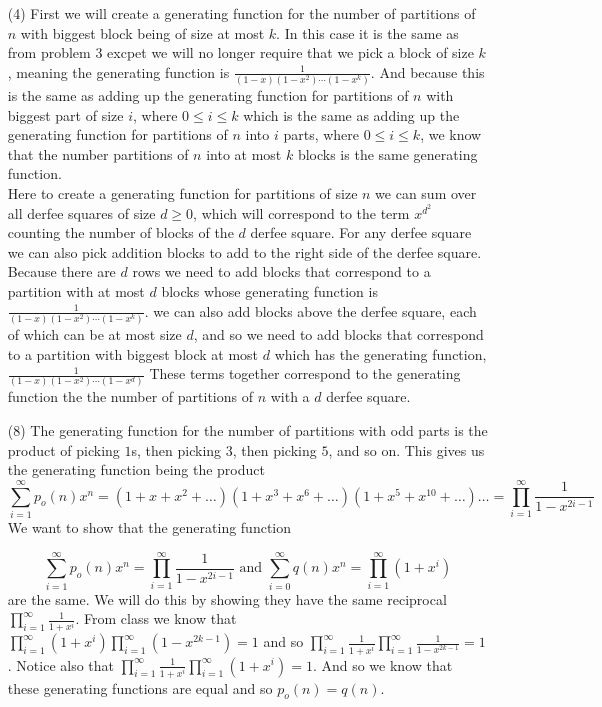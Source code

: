 \documentclass[12pt]{amsart}
\theoremstyle{definition}
\begin{document}
\begin{itemize}
\item[(4)] %
First we will create a generating function for the number of partitions of $n$ with biggest block being of size at most $k$. In this case it is the same as from problem $3$ excpet we will no longer require that we pick a block of size $k$, meaning the generating function is $\frac{1}{(1-x)(1-x^2)\cdots (1-x^k)}$. And because this is the same as adding up the generating function for partitions of $n$ with biggest part of size $i$, where $0\leq i\leq k$ which is the same as adding up the generating function for partitions of $n$ into $i$ parts, where $0\leq i\leq k$, we know that the number partitions of $n$ into at most $k$ blocks is the same generating function.\\

Here to create a generating function for partitions of size $n$ we can sum over all derfee squares of size $d\geq 0$, which will correspond to the term $x^{d^2}$ counting the number of blocks of the $d$ derfee square. For any derfee square we can also pick addition blocks to add to the right side of the derfee square. Because there are $d$ rows we need to add blocks that correspond to a partition with at most $d$ blocks whose generating function is $\frac{1}{(1-x)(1-x^2)\cdots (1-x^k)}$. we can also add blocks above the derfee square, each of which can be at most size $d$, and so we need to add blocks that correspond to a partition with biggest block at most $d$ which has the generating function, $\frac{1}{(1-x)(1-x^2)\cdots (1-x^d)}$ These terms together correspond to the generating function the the number of partitions of $n$ with a $d$ derfee square.\\

\item[(8)] %
The generating function for the number of partitions with odd parts is the product of picking $1$s, then picking $3$, then picking $5$, and so on. This gives us the generating function being the product $$\sum_{i=1}^{\infty} p_o(n)x^n= (1+x+x^2+\dots)(1+x^3+x^6+\dots)(1+x^5+x^{10}+\dots)\dots=\prod_{i=1}^\infty \frac{1}{1-x^{2i-1}}$$
We want to show that the generating function 

$${\sum_{i=1}^{\infty} p_o(n)x^n=\prod_{i=1}^\infty \frac{1}{1-x^{2i-1}}}\text{ and }{\sum_{i=0}^\infty q(n)x^n=\prod_{i=1}^{\infty}(1+x^i)}$$
are the same. We will do this by showing they have the same reciprocal $\prod_{i=1}^{\infty}\frac{1}{1+x^i}$. From class we know that $\prod_{i=1}^{\infty}(1+x^i)\prod_{i=1}^{\infty}(1-x^{2k-1})=1$ and so $\prod_{i=1}^{\infty}\frac{1}{1+x^i}\prod_{i=1}^{\infty}\frac{1}{1-x^{2k-1}}=1$. Notice also that $\prod_{i=1}^{\infty}\frac{1}{1+x^i}\prod_{i=1}^{\infty}(1+x^i)=1$. And so we know that these generating functions are equal and so $p_o(n)=q(n)$.


\end{itemize}
\end{document}
